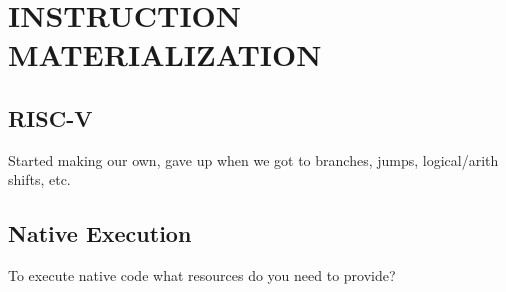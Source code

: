 \chapter{INSTRUCTION MATERIALIZATION}
\label{insn}

\section{RISC-V}
\label{insn:riscv}
Started making our own, gave up when we got to branches, jumps, logical/arith shifts, etc.

\section{Native Execution}
\label{insn:native}
To execute native code what resources do you need to provide?

